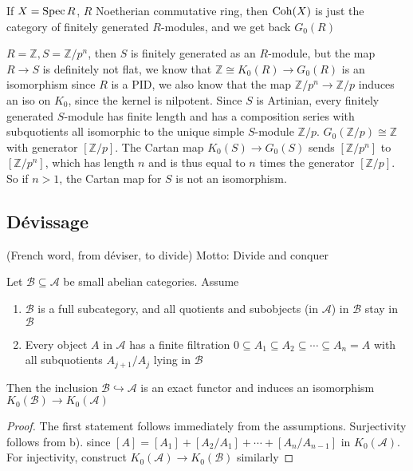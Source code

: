 \documentclass[main]{subfiles}
\begin{document}
If $X=\operatorname{Spec} R$, $R$ Noetherian commutative ring, then $\operatorname{Coh}(X)$ is just the category of finitely generated $R$-modules, and we get back $G_0(R)$


\begin{example}
$R=\mathbb Z,S=\mathbb Z/p^n$, then $S$ is finitely generated as an $R$-module, but the map $R\to S$ is definitely not flat, we know that $\mathbb Z\cong K_0(R)\to G_0(R)$ is an isomorphism since $R$ is a PID, we also know that the map $\mathbb Z/p^n\to\mathbb Z/p$ induces an iso on $K_0$, since the kernel is nilpotent. Since $S$ is Artinian, every finitely generated $S$-module has finite length and has a composition series with subquotients all isomorphic to the unique simple $S$-module $\mathbb Z/p$. $G_0(\mathbb Z/p)\cong \mathbb Z$ with generator $[\mathbb Z/p]$. The Cartan map $K_0(S)\to G_0(S)$ sends $[\mathbb Z/p^n]$ to $[\mathbb Z/p^n]$, which has length $n$ and is thus equal to $n$ times the generator $[\mathbb Z/p]$. So if $n>1$, the Cartan map for $S$ is not an isomorphism.
\end{example}

\subsection{D\'evissage}
(French word, from d\'eviser, to divide) Motto: Divide and conquer

\begin{theorem}
Let $\mathscr B\subseteq\mathscr A$ be small abelian categories. Assume
\begin{enumerate}
\item $\mathscr B$ is a full subcategory, and all quotients and subobjects (in $\mathscr A$) in $\mathscr B$ stay in $\mathscr B$
\item Every object $A$ in $\mathscr A$ has a finite filtration $0\subseteq A_1\subseteq A_2\subseteq\cdots\subseteq A_n=A$ with all subquotients $A_{j+1}/A_j$ lying in $\mathscr B$
\end{enumerate}
Then the inclusion $\mathscr B\hookrightarrow\mathscr A$ is an exact functor and induces an isomorphism $K_0(\mathscr B)\to K_0(\mathscr A)$
\end{theorem}

\begin{proof}
The first statement follows immediately from the assumptions. Surjectivity follows from b). since $[A]=[A_1]+[A_2/A_1]+\cdots+[A_n/A_{n-1}]$ in $K_0(\mathscr A)$. For injectivity, construct $K_0(\mathscr A)\to K_0(\mathscr B)$ similarly
\end{proof}
\end{document}
